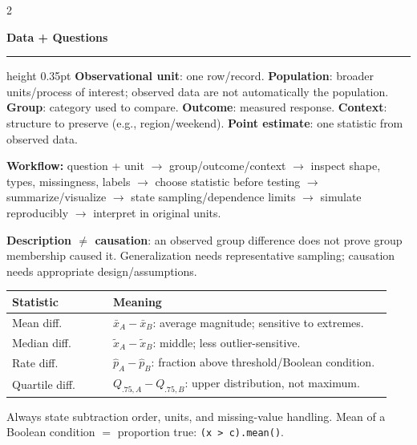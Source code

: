 \documentclass[8pt]{article}
\newcommand{\sect}[1]{\vspace{1pt}\textcolor{accent}{\textbf{\normalsize #1}}\par\vspace{1pt}\hrule height 0.35pt\vspace{0pt}}
\newcommand{\term}[1]{\textbf{#1}}
\newcommand{\code}[1]{\texttt{#1}}
\begin{document}
\scriptsize
\begin{multicols*}{2}

\sect{Data + Questions}
\term{Observational unit}: one row/record. \term{Population}: broader units/process of interest; observed data are not automatically the population. \term{Group}: category used to compare. \term{Outcome}: measured response. \term{Context}: structure to preserve (e.g., region/weekend). \term{Point estimate}: one statistic from observed data.

\term{Workflow:} question + unit $\rightarrow$ group/outcome/context $\rightarrow$ inspect shape, types, missingness, labels $\rightarrow$ choose statistic before testing $\rightarrow$ summarize/visualize $\rightarrow$ state sampling/dependence limits $\rightarrow$ simulate reproducibly $\rightarrow$ interpret in original units.

\term{Description $\ne$ causation}: an observed group difference does not prove group membership caused it. Generalization needs representative sampling; causation needs appropriate design/assumptions.

\begin{tabular}{@{}p{0.25\linewidth}p{0.69\linewidth}@{}}
\toprule
Statistic & Meaning \\
\midrule
Mean diff. & $\bar x_A-\bar x_B$: average magnitude; sensitive to extremes.\\
Median diff. & $\widetilde{x}_A-\widetilde{x}_B$: middle; less outlier-sensitive.\\
Rate diff. & $\hat p_A-\hat p_B$: fraction above threshold/Boolean condition.\\
Quartile diff. & $Q_{.75,A}-Q_{.75,B}$: upper distribution, not maximum.\\
\bottomrule
\end{tabular}

Always state subtraction order, units, and missing-value handling. Mean of a Boolean condition $=$ proportion true: \code{(x > c).mean()}.


\end{multicols*}
\end{document}

